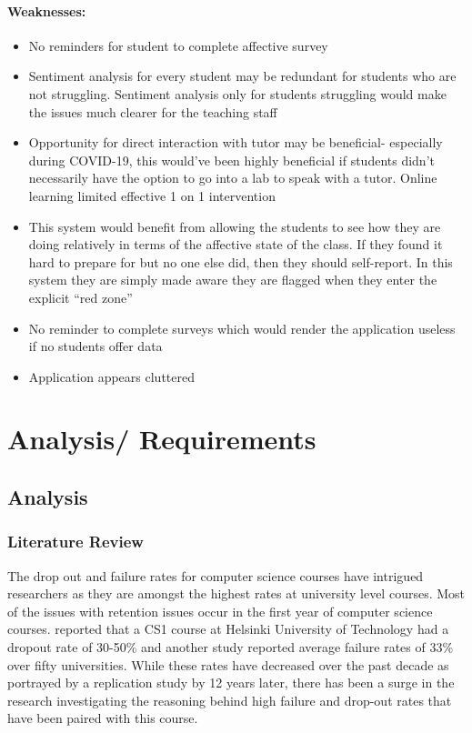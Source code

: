 \documentclass{l4proj}
\begin{document}
\subsubsection{Weaknesses:}
\begin{itemize}
    \item No reminders for student to complete affective survey
    \item Sentiment analysis for every student may be redundant for students who are not struggling. Sentiment analysis only for students struggling would make the issues much clearer for the teaching staff
    \item Opportunity for direct interaction with tutor may be beneficial- especially during COVID-19, this would’ve been highly beneficial if students didn’t necessarily have the option to go into a lab to speak with a tutor. Online learning limited effective 1 on 1 intervention
    \item This system would benefit from allowing the students to see how they are doing relatively in terms of the affective state of the class. If they found it hard to prepare for but no one else did, then they should self-report. In this system they are simply made aware they are flagged when they enter the explicit “red zone”
    \item No reminder to complete surveys which would render the application useless if no students offer data
    \item Application appears cluttered
\end{itemize}




\chapter{Analysis/ Requirements}

\section{Analysis}

\subsection{Literature Review}
The drop out and failure rates for computer science courses have intrigued researchers as they are amongst the highest rates at university level courses. Most of the issues with retention issues occur in the first year of computer science courses. \cite{kinnunen_why_2006} reported that a CS1 course at Helsinki University of Technology had a dropout rate of 30-50\% and another study reported average failure rates of 33\% \citep{bennedsen_failure_2007} over fifty universities. While these rates have decreased over the past decade as portrayed by a replication study by \cite{bennedsen_failure_2019} 12 years later, there has been a surge in the research investigating the reasoning behind high failure and drop-out rates that have been paired with this course.
\end{document}

